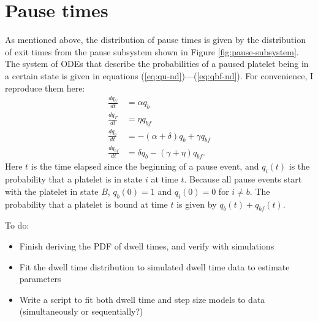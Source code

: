 \documentclass{article}
\newcommand{\dd}{d}
\newcommand{\Der}[2]{\frac{\dd #1}{\dd #2}}
\begin{document}
\section{Pause times}
\label{sec:pause-times}

As mentioned above, the distribution of pause times is given by the
distribution of exit times from the pause subsystem shown in Figure
\ref{fig:pause-subsystem}. The system of ODEs that describe the
probabilities of a paused platelet being in a certain state is given
in equations (\ref{eq:qu-nd})---(\ref{eq:qbf-nd}). For convenience, I
reproduce them here:
\begin{align*}
  \Der{q_U}{t} &= \alpha q_b \\
  \Der{q_T}{t} &= \eta q_{bf} \\
  \Der{q_b}{t} &= -(\alpha + \delta) q_b + \gamma q_{bf} \\
  \Der{q_{bf}}{t} &= \delta q_b - (\gamma + \eta) q_{bf}.
\end{align*}
Here $t$ is the time elapsed since the beginning of a pause event, and
$q_i(t)$ is the probability that a platelet is in state $i$ at time
$t$. Because all pause events start with the platelet in state $B$,
$q_b(0) = 1$ and $q_i(0) = 0$ for $i \neq b$. The probability that a
platelet is bound at time $t$ is given by $q_b(t) + q_{bf}(t)$.

To do:
\begin{itemize}
\item Finish deriving the PDF of dwell times, and verify with simulations
\item Fit the dwell time distribution to simulated dwell time data to
  estimate parameters
\item Write a script to fit both dwell time and step size models to
  data (simultaneously or sequentially?)
\end{itemize}

% 
% 
\end{document}
